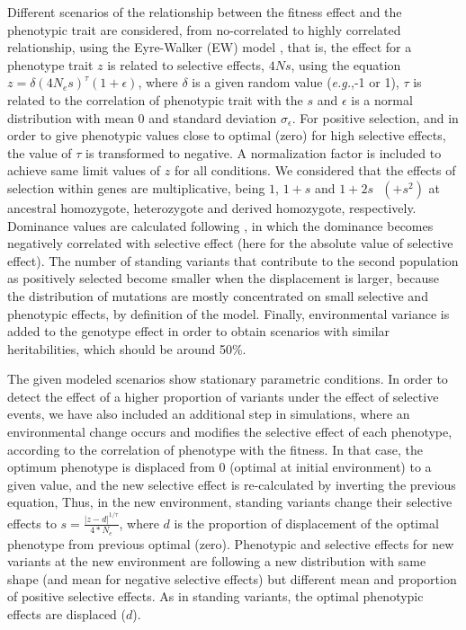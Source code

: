 \documentclass[a4paper,11pt]{article}
\begin{document}
Different scenarios of the relationship between the fitness effect and the phenotypic trait are considered, from no-correlated to highly correlated relationship, using the Eyre-Walker (EW) model \citep{Eyre-Walker:2010aa}, that is, the effect for a phenotype trait $z$ is related to selective effects, $4Ns$, using the equation $z=\delta (4N_e s)^\tau (1+\epsilon)$, where $\delta$ is a given random value (\textit{e.g.},-1 or 1), $\tau$ is related to the correlation of phenotypic trait with the $s$ and $\epsilon$ is a normal distribution with mean 0 and standard deviation $\sigma_{\epsilon}$. For positive selection, and in order to give phenotypic values close to optimal (zero) for high selective effects, the value of $\tau$ is transformed to negative. A normalization factor is included to achieve same limit values of $z$ for all conditions. We considered that the effects of selection within genes are multiplicative, being $1$, $1+s$ and $1+2s\text{ }(+s^2)$ at ancestral homozygote, heterozygote and derived homozygote, respectively. Dominance values are calculated following \citet{Wang:1998aa}, in which the dominance becomes negatively correlated with selective effect (here for the absolute value of selective effect).  The number of standing variants that contribute to the second  population as positively selected become smaller when the displacement is larger, because the distribution of mutations are mostly concentrated on small selective and phenotypic effects, by definition of the model. Finally, environmental variance is added to the genotype effect in order to obtain scenarios with similar heritabilities, which should be around 50\%. 

The given modeled scenarios show stationary parametric conditions. In order to detect the effect of a higher proportion of variants under the effect of selective events, we have also included an additional step in simulations, where an environmental change occurs and modifies the selective effect of each phenotype, according to the correlation of phenotype with the fitness. In that case, the optimum phenotype is displaced from 0 (optimal at initial environment) to a given value, and the new selective effect is re-calculated by inverting the previous equation, Thus, in the new environment, standing variants change their selective effects to $s=\frac{|z-d|^{1/\tau}}{4*N_e}$, where $d$ is the proportion of displacement of the optimal phenotype from previous optimal (zero). Phenotypic and selective effects for new variants at the new environment are following a new distribution with same shape (and mean for negative selective effects) but different mean and proportion of positive selective effects. As in standing variants, the optimal phenotypic effects are displaced ($d$). %
\end{document}
